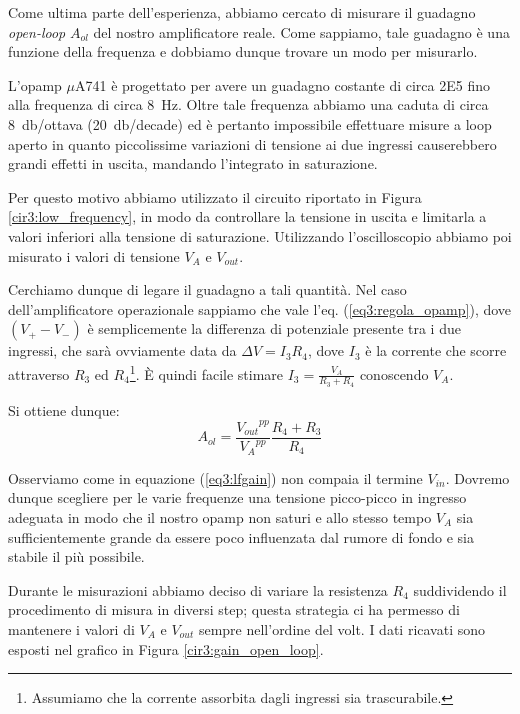Come ultima parte dell'esperienza, abbiamo cercato di misurare il guadagno \textit{open-loop} $A_{ol}$ del nostro amplificatore reale.
Come sappiamo, tale guadagno è una funzione della frequenza e dobbiamo dunque trovare un modo per misurarlo.

L'opamp $\mu$A741 è progettato per avere un guadagno costante di circa \num{2E5} fino alla frequenza di circa \SI{8}{\Hz}.
Oltre tale frequenza abbiamo una caduta di circa \SI{8}{\decibel}/ottava (\SI{20}{\decibel}/decade) ed è pertanto impossibile effettuare misure a loop aperto in quanto piccolissime variazioni di tensione ai due ingressi causerebbero grandi effetti in uscita, mandando l'integrato in saturazione.

Per questo motivo abbiamo utilizzato il circuito riportato in Figura \ref{cir3:low_frequency}, in modo da controllare la tensione in uscita e limitarla a valori inferiori alla tensione di saturazione.
Utilizzando l'oscilloscopio abbiamo poi misurato i valori di tensione $V_A$ e $V_{out}$.

Cerchiamo dunque di legare il guadagno a tali quantità.
Nel caso dell'amplificatore operazionale sappiamo che vale l'eq. (\ref{eq3:regola_opamp}), dove $(V_+-V_-)$ è semplicemente la differenza di potenziale presente tra i due ingressi, che sarà ovviamente data da $\Delta V = I_3R_4$, dove $I_3$ è la corrente che scorre attraverso $R_3$ ed $R_4$\footnote{Assumiamo che la corrente assorbita dagli ingressi sia trascurabile.}.
È quindi facile stimare $I_3=\frac{V_A}{R_3+R_4}$ conoscendo $V_A$.

Si ottiene dunque:
\begin{equation}
A_{ol}=\frac{{V_{out}}^{pp}}{{V_A}^{pp}} \frac{R_4+R_3}{R_4}
\label{eq3:lfgain}
\end{equation}

Osserviamo come in equazione (\ref{eq3:lfgain}) non compaia il termine $V_{in}$.
Dovremo dunque scegliere per le varie frequenze una tensione picco-picco in ingresso adeguata in modo che il nostro opamp non saturi e allo stesso tempo $V_A$ sia sufficientemente grande da essere poco influenzata dal rumore di fondo e sia stabile il più possibile.

Durante le misurazioni abbiamo deciso di variare la resistenza $R_4$ suddividendo il procedimento di misura in diversi step; questa strategia ci ha permesso di mantenere i valori di $V_A$ e $V_{out}$ sempre nell'ordine del volt.
I dati ricavati sono esposti nel grafico in Figura \ref{cir3:gain_open_loop}.

